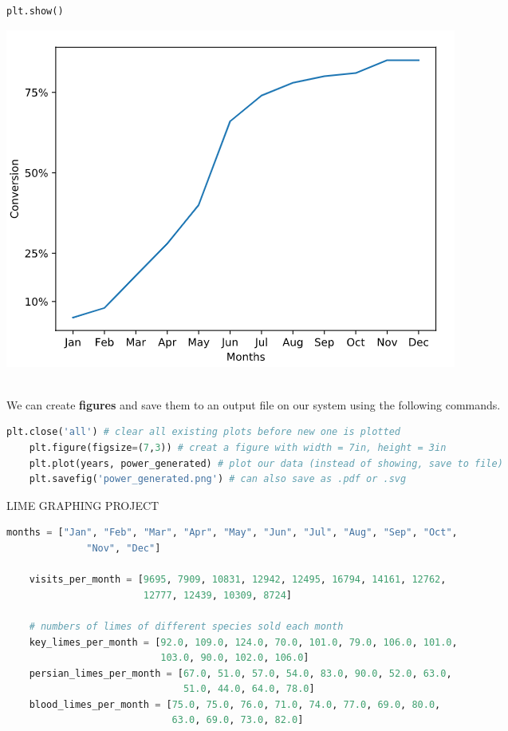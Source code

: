 \documentclass[11pt, a4paper]{article}
\begin{document}
\begin{spacing}{1.1}
\begin{minipage}[c]{10cm}
\begin{lstlisting}[language=Python]
	plt.show() \end{lstlisting}\vspace*{1mm}
	\end{minipage}
	\begin{minipage}[c]{7cm}
		\includegraphics[scale=.52]{ticks}
	\end{minipage} \\
	We can create \textbf{figures} and save them to an output file on our system using the following commands.
	\begin{lstlisting}[language=Python]
	plt.close('all') # clear all existing plots before new one is plotted
	plt.figure(figsize=(7,3)) # creat a figure with width = 7in, height = 3in
	plt.plot(years, power_generated) # plot our data (instead of showing, save to file)
	plt.savefig('power_generated.png') # can also save as .pdf or .svg \end{lstlisting} \newpage
	\noindent LIME GRAPHING PROJECT
	\begin{lstlisting}[language=Python]
	months = ["Jan", "Feb", "Mar", "Apr", "May", "Jun", "Jul", "Aug", "Sep", "Oct", 
	          "Nov", "Dec"]
	
	visits_per_month = [9695, 7909, 10831, 12942, 12495, 16794, 14161, 12762, 
	                    12777, 12439, 10309, 8724]
	
	# numbers of limes of different species sold each month
	key_limes_per_month = [92.0, 109.0, 124.0, 70.0, 101.0, 79.0, 106.0, 101.0, 
	                       103.0, 90.0, 102.0, 106.0]
	persian_limes_per_month = [67.0, 51.0, 57.0, 54.0, 83.0, 90.0, 52.0, 63.0, 
	                           51.0, 44.0, 64.0, 78.0]
	blood_limes_per_month = [75.0, 75.0, 76.0, 71.0, 74.0, 77.0, 69.0, 80.0, 
	                         63.0, 69.0, 73.0, 82.0]
	

\end{lstlisting}
\end{spacing}
\end{document}
